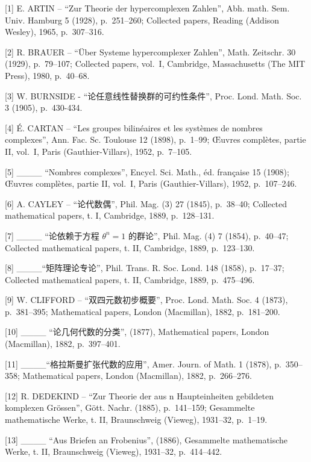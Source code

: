 
{[}1{]} E. ARTIN -- ``Zur Theorie der hypercomplexen Zahlen'', Abh. math. Sem. Univ. Hamburg 5 (1928), p.~251--260; Collected papers, Reading (Addison Wesley), 1965, p.~307--316.

{[}2{]} R. BRAUER -- ``Über Systeme hypercomplexer Zahlen'', Math. Zeitschr. 30 (1929), p.~79--107; Collected papers, vol.~I, Cambridge, Massachusetts (The MIT Press), 1980, p.~40--68.

{[}3{]} W. BURNSIDE - ``论任意线性替换群的可约性条件'', Proc. Lond. Math. Soc. 3 (1905), p.~430-434.

{[}4{]} É. CARTAN -- ``Les groupes bilinéaires et les systèmes de nombres complexes'', Ann. Fac. Sc. Toulouse 12 (1898), p.~1--99; Œuvres complètes, partie II, vol.~I, Paris (Gauthier-Villars), 1952, p.~7--105.

{[}5{]} \_\_\_\_ ``Nombres complexes'', Encycl. Sci. Math., éd. française 15 (1908); Œuvres complètes, partie II, vol.~I, Paris (Gauthier-Villars), 1952, p.~107--246.

{[}6{]} A. CAYLEY -- ``论代数偶'', Phil. Mag. (3) 27 (1845), p.~38--40; Collected mathematical papers, t. I, Cambridge, 1889, p.~128--131.

{[}7{]} \_\_\_\_ ``论依赖于方程 \(\theta^{n}=1\) 的群论'', Phil. Mag. (4) 7 (1854), p.~40--47; Collected mathematical papers, t. II, Cambridge, 1889, p.~123--130.

{[}8{]} \_\_\_\_``矩阵理论专论'', Phil. Trans. R. Soc. Lond. 148 (1858), p.~17--37; Collected mathematical papers, t. II, Cambridge, 1889, p.~475--496.

{[}9{]} W. CLIFFORD -- ``双四元数初步概要'', Proc. Lond. Math. Soc. 4 (1873), p.~381--395; Mathematical papers, London (Macmillan), 1882, p.~181--200.

{[}10{]} \_\_\_\_ ``论几何代数的分类'', (1877), Mathematical papers, London (Macmillan), 1882, p.~397--401.

{[}11{]} \_\_\_\_``格拉斯曼扩张代数的应用'', Amer. Journ. of Math. 1 (1878), p.~350--358; Mathematical papers, London (Macmillan), 1882, p.~266--276.

{[}12{]} R. DEDEKIND -- ``Zur Theorie der aus n Haupteinheiten gebildeten komplexen Grössen'', Gött. Nachr. (1885), p.~141--159; Gesammelte mathematische Werke, t. II, Braunschweig (Vieweg), 1931--32, p.~1--19.

{[}13{]} \_\_\_\_ ``Aus Briefen an Frobenius'', (1886), Gesammelte mathematische Werke, t. II, Braunschweig (Vieweg), 1931--32, p.~414--442.

